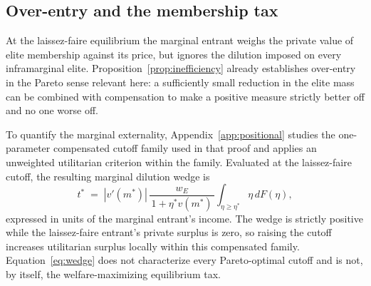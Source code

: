 \documentclass[12pt,letterpaper]{article}
\theoremstyle{definition}
\begin{document}
\subsection{Over-entry and the membership tax}

At the laissez-faire equilibrium the marginal entrant weighs the private value of elite membership against its price, but ignores the dilution imposed on every inframarginal elite.
Proposition~\ref{prop:inefficiency} already establishes over-entry in the Pareto sense relevant here: a sufficiently small reduction in the elite mass can be combined with compensation to make a positive measure strictly better off and no one worse off.

To quantify the marginal externality, Appendix~\ref{app:positional} studies the one-parameter compensated cutoff family used in that proof and applies an unweighted utilitarian criterion within the family.
Evaluated at the laissez-faire cutoff, the resulting marginal dilution wedge is
\begin{equation}\label{eq:wedge}
  t^\ast \;=\; \left|v'(m^\ast)\right|\, \frac{w_E}{\,1+\eta^\ast v(m^\ast)\,}
  \int_{\eta\geq\eta^\ast}\!\! \eta\, dF(\eta),
\end{equation}
expressed in units of the marginal entrant's income.
The wedge is strictly positive while the laissez-faire entrant's private surplus is zero, so raising the cutoff increases utilitarian surplus locally within this compensated family.
Equation~\eqref{eq:wedge} does not characterize every Pareto-optimal cutoff and is not, by itself, the welfare-maximizing equilibrium tax.
\end{document}
